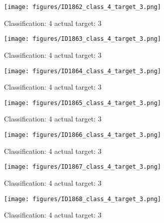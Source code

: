 \begin{figure}[h!]
\begin{center}
\texttt{[image: figures/ID1862\_class\_4\_target\_3.png]}
\end{center}
\caption{ Classification: 4 actual target: 3}
\label{fig:ID1862_class_4_target_3}
\end{figure}
\begin{figure}[h!]
\begin{center}
\texttt{[image: figures/ID1863\_class\_4\_target\_3.png]}
\end{center}
\caption{ Classification: 4 actual target: 3}
\label{fig:ID1863_class_4_target_3}
\end{figure}
\begin{figure}[h!]
\begin{center}
\texttt{[image: figures/ID1864\_class\_4\_target\_3.png]}
\end{center}
\caption{ Classification: 4 actual target: 3}
\label{fig:ID1864_class_4_target_3}
\end{figure}
\begin{figure}[h!]
\begin{center}
\texttt{[image: figures/ID1865\_class\_4\_target\_3.png]}
\end{center}
\caption{ Classification: 4 actual target: 3}
\label{fig:ID1865_class_4_target_3}
\end{figure}
\begin{figure}[h!]
\begin{center}
\texttt{[image: figures/ID1866\_class\_4\_target\_3.png]}
\end{center}
\caption{ Classification: 4 actual target: 3}
\label{fig:ID1866_class_4_target_3}
\end{figure}
\begin{figure}[h!]
\begin{center}
\texttt{[image: figures/ID1867\_class\_4\_target\_3.png]}
\end{center}
\caption{ Classification: 4 actual target: 3}
\label{fig:ID1867_class_4_target_3}
\end{figure}
\begin{figure}[h!]
\begin{center}
\texttt{[image: figures/ID1868\_class\_4\_target\_3.png]}
\end{center}
\caption{ Classification: 4 actual target: 3}
\label{fig:ID1868_class_4_target_3}
\end{figure}
